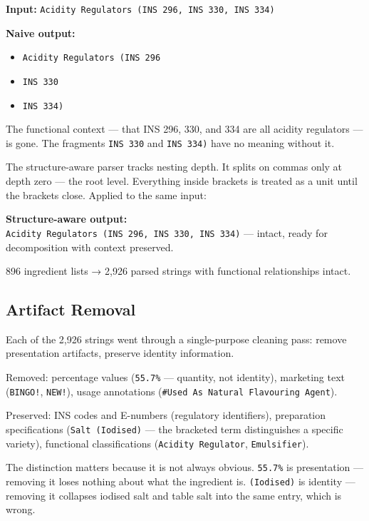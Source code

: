 \documentclass[
  letterpaper,
  DIV=11,
  numbers=noendperiod]{scrartcl}
\providecommand{\tightlist}{%
  \setlength{\itemsep}{0pt}\setlength{\parskip}{0pt}}
\begin{document}
\textbf{Input:}
\texttt{Acidity\ Regulators\ (INS\ 296,\ INS\ 330,\ INS\ 334)}

\textbf{Naive output:}

\begin{itemize}
\tightlist
\item
  \texttt{Acidity\ Regulators\ (INS\ 296}
\item
  \texttt{INS\ 330}
\item
  \texttt{INS\ 334)}
\end{itemize}

The functional context --- that INS 296, 330, and 334 are all acidity
regulators --- is gone. The fragments \texttt{INS\ 330} and
\texttt{INS\ 334)} have no meaning without it.

The structure-aware parser tracks nesting depth. It splits on commas
only at depth zero --- the root level. Everything inside brackets is
treated as a unit until the brackets close. Applied to the same input:

\textbf{Structure-aware output:}
\texttt{Acidity\ Regulators\ (INS\ 296,\ INS\ 330,\ INS\ 334)} ---
intact, ready for decomposition with context preserved.

896 ingredient lists → 2,926 parsed strings with functional
relationships intact.

\subsection{Artifact Removal}\label{artifact-removal}

Each of the 2,926 strings went through a single-purpose cleaning pass:
remove presentation artifacts, preserve identity information.

Removed: percentage values (\texttt{55.7\%} --- quantity, not identity),
marketing text (\texttt{BINGO!}, \texttt{NEW!}), usage annotations
(\texttt{\#Used\ As\ Natural\ Flavouring\ Agent}).

Preserved: INS codes and E-numbers (regulatory identifiers), preparation
specifications (\texttt{Salt\ (Iodised)} --- the bracketed term
distinguishes a specific variety), functional classifications
(\texttt{Acidity\ Regulator}, \texttt{Emulsifier}).

The distinction matters because it is not always obvious.
\texttt{55.7\%} is presentation --- removing it loses nothing about what
the ingredient is. \texttt{(Iodised)} is identity --- removing it
collapses iodised salt and table salt into the same entry, which is
wrong.
\end{document}
